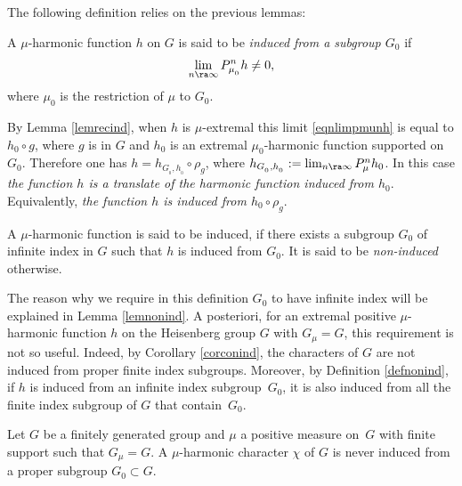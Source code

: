 The following definition relies on the previous lemmas:

\begin{Def}

\label{defnonind}
A $\mu$-harmonic function $h$ on $G$
is said to be \emph{induced from a subgroup $G_0$}
if
\begin{equation}
\label{eqnlimpmunh}
\lim_{n\ra\infty}P_{\mu_{_0}}^nh\neq 0,
\end{equation}
where $\mu_0$ is the restriction of $\mu$ to $G_0$.

By Lemma \ref{lemrecind}, when $h$ is $\mu$-extremal this limit
\eqref{eqnlimpmunh} is equal to $h_0\circ g$, where
$g$ is in $G$ and
$h_0$ is an extremal $\mu_0$-harmonic function supported on $G_0$.
Therefore one has $h=h_{G_{_0},h_{_0}}\circ \rho_g$,
where $h_{G_{_0},h_{_0}}:=
\lim_{n\ra\infty}P_{\mu}^nh_0$.
In this case \emph{the function $h$ is a translate of
the harmonic function induced from $h_0$}.
Equivalently, \emph{the function $h$ is induced from $h_0\circ \rho_g$}.
\end{Def}

\begin{Def}

\label{defnonindsuite}
A $\mu$-harmonic function is said to be {induced},
if there exists a subgroup $G_0$ of infinite index in $G$
such that $h$ is induced from $G_0$.
It is said to be \emph{non-induced} otherwise.
\end{Def}

\begin{Rem}

The reason why we require in this definition $G_0$ to have infinite index
will be explained in Lemma \ref{lemnonind}.
A posteriori, for an extremal positive $\mu$-harmonic function
$h$ on the Heisenberg group $G$ with $G_\mu=G$,
this requirement is not so useful.
Indeed, by Corollary \ref{corconind}, the characters of $G$ are not induced
from proper finite index subgroups.
Moreover, by Definition \ref{defnonind}, if $h$ is induced from an infinite index subgroup~$G_0$, it is also induced from all the finite index subgroup of $G$ that contain~$G_0$.
\end{Rem}

\begin{Cor}
\label{corconind}
Let $G$ be a finitely generated group and
$\mu$ a positive measure on~$G$ with finite support such that $G_\mu=G$.
A $\mu$-harmonic character $\chi$ of $G$
is never induced from a proper subgroup $G_0\subset G$.
\end{Cor}

